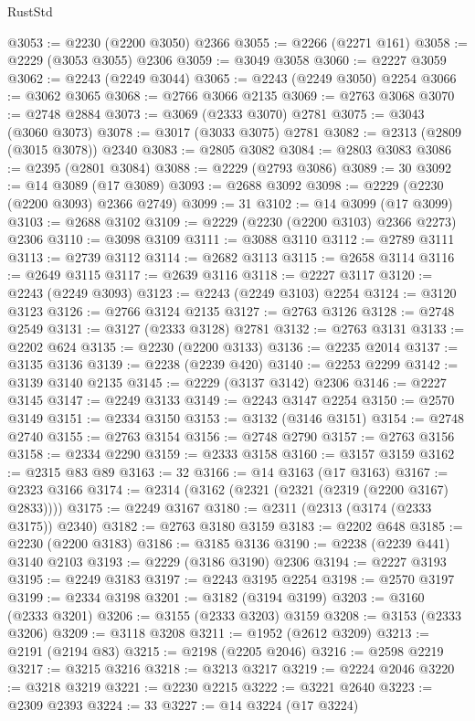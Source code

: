 \begin{lexlean}{RustStd}
\begin{coremodule}
@3053 := @2230 (@2200 @3050) @2366
@3055 := @2266 (@2271 @161)
@3058 := @2229 (@3053 @3055) @2306
@3059 := @3049 @3058
@3060 := @2227 @3059
@3062 := @2243 (@2249 @3044)
@3065 := @2243 (@2249 @3050) @2254
@3066 := @3062 @3065
@3068 := @2766 @3066 @2135
@3069 := @2763 @3068
@3070 := @2748 @2884
@3073 := @3069 (@2333 @3070) @2781
@3075 := @3043 (@3060 @3073)
@3078 := @3017 (@3033 @3075) @2781
@3082 := @2313 (@2809 (@3015 @3078)) @2340
@3083 := @2805 @3082
@3084 := @2803 @3083
@3086 := @2395 (@2801 @3084)
@3088 := @2229 (@2793 @3086)
@3089 := 30
@3092 := @14 @3089 (@17 @3089)
@3093 := @2688 @3092
@3098 := @2229 (@2230 (@2200 @3093) @2366 @2749)
@3099 := 31
@3102 := @14 @3099 (@17 @3099)
@3103 := @2688 @3102
@3109 := @2229 (@2230 (@2200 @3103) @2366 @2273) @2306
@3110 := @3098 @3109
@3111 := @3088 @3110
@3112 := @2789 @3111
@3113 := @2739 @3112
@3114 := @2682 @3113
@3115 := @2658 @3114
@3116 := @2649 @3115
@3117 := @2639 @3116
@3118 := @2227 @3117
@3120 := @2243 (@2249 @3093)
@3123 := @2243 (@2249 @3103) @2254
@3124 := @3120 @3123
@3126 := @2766 @3124 @2135
@3127 := @2763 @3126
@3128 := @2748 @2549
@3131 := @3127 (@2333 @3128) @2781
@3132 := @2763 @3131
@3133 := @2202 @624
@3135 := @2230 (@2200 @3133)
@3136 := @2235 @2014
@3137 := @3135 @3136
@3139 := @2238 (@2239 @420)
@3140 := @2253 @2299
@3142 := @3139 @3140 @2135
@3145 := @2229 (@3137 @3142) @2306
@3146 := @2227 @3145
@3147 := @2249 @3133
@3149 := @2243 @3147 @2254
@3150 := @2570 @3149
@3151 := @2334 @3150
@3153 := @3132 (@3146 @3151)
@3154 := @2748 @2740
@3155 := @2763 @3154
@3156 := @2748 @2790
@3157 := @2763 @3156
@3158 := @2334 @2290
@3159 := @2333 @3158
@3160 := @3157 @3159
@3162 := @2315 @83 @89
@3163 := 32
@3166 := @14 @3163 (@17 @3163)
@3167 := @2323 @3166
@3174 := @2314 (@3162 (@2321 (@2321 (@2319 (@2200 @3167) @2833))))
@3175 := @2249 @3167
@3180 := @2311 (@2313 (@3174 (@2333 @3175)) @2340)
@3182 := @2763 @3180 @3159
@3183 := @2202 @648
@3185 := @2230 (@2200 @3183)
@3186 := @3185 @3136
@3190 := @2238 (@2239 @441) @3140 @2103
@3193 := @2229 (@3186 @3190) @2306
@3194 := @2227 @3193
@3195 := @2249 @3183
@3197 := @2243 @3195 @2254
@3198 := @2570 @3197
@3199 := @2334 @3198
@3201 := @3182 (@3194 @3199)
@3203 := @3160 (@2333 @3201)
@3206 := @3155 (@2333 @3203) @3159
@3208 := @3153 (@2333 @3206)
@3209 := @3118 @3208
@3211 := @1952 (@2612 @3209)
@3213 := @2191 (@2194 @83)
@3215 := @2198 (@2205 @2046)
@3216 := @2598 @2219
@3217 := @3215 @3216
@3218 := @3213 @3217
@3219 := @2224 @2046
@3220 := @3218 @3219
@3221 := @2230 @2215
@3222 := @3221 @2640
@3223 := @2309 @2393
@3224 := 33
@3227 := @14 @3224 (@17 @3224)

\end{coremodule}
\end{lexlean}
